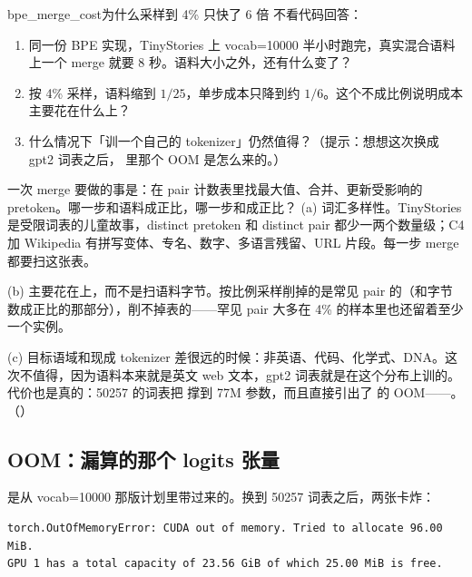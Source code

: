 \begin{checkpoint}{bpe_merge_cost}{为什么采样到 4\% 只快了 6 倍}
不看代码回答：
\begin{enumerate}[label=(\alph*)]
  \item 同一份 BPE 实现，TinyStories 上 vocab=10000 半小时跑完，真实混合语料上一个 merge 就要 8 秒。语料大小之外，还有什么变了？
  \item 按 4\% 采样，语料缩到 $1/25$，单步成本只降到约 $1/6$。这个不成比例说明成本主要花在什么上？
  \item 什么情况下「训一个自己的 tokenizer」仍然值得？（提示：想想这次换成 gpt2 词表之后， 里那个 OOM 是怎么来的。）
\end{enumerate}
\hint 一次 merge 要做的事是：在 pair 计数表里找最大值、合并、更新受影响的 pretoken。哪一步和语料成正比，哪一步和成正比？
\ifshowanswers
\tcblower
\answer (a) 词汇多样性。TinyStories 是受限词表的儿童故事，distinct pretoken 和 distinct pair 都少一两个数量级；C4 加 Wikipedia 有拼写变体、专名、数字、多语言残留、URL 片段。每一步 merge 都要扫这张表。

(b) 主要花在上，而不是扫语料字节。按比例采样削掉的是常见 pair 的（和字节数成正比的那部分），削不掉表的——罕见 pair 大多在 4\% 的样本里也还留着至少一个实例。

(c) 目标语域和现成 tokenizer 差很远的时候：非英语、代码、化学式、DNA。这次不值得，因为语料本来就是英文 web 文本，gpt2 词表就是在这个分布上训的。代价也是真的：50257 的词表把  撑到 77M 参数，而且直接引出了  的 OOM——。
\whereincode {}（）
\fi
\end{checkpoint}

\subsection{OOM：漏算的那个 logits 张量}
\label{subsec:oom}

 是从 vocab=10000 那版计划里带过来的。换到 50257 词表之后，两张卡炸：

\begin{lstlisting}[style=hlrepl]
torch.OutOfMemoryError: CUDA out of memory. Tried to allocate 96.00 MiB.
GPU 1 has a total capacity of 23.56 GiB of which 25.00 MiB is free.
\end{lstlisting}

